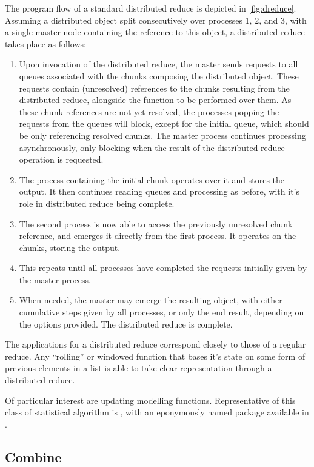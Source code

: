 The program flow of a standard distributed reduce is depicted in \cref{fig:dreduce}.
Assuming a distributed object split consecutively over processes 1, 2, and 3, with a single master node containing the reference to this object, a distributed reduce takes place as follows:
\begin{enumerate}
	\item Upon invocation of the distributed reduce, the master sends requests to all queues associated with the chunks composing the distributed object. These requests contain (unresolved) references to the chunks resulting from the distributed reduce, alongside the function to be performed over them. As these chunk references are not yet resolved, the processes popping the requests from the queues will block, except for the initial queue, which should be only referencing resolved chunks. The master process continues processing asynchronously, only blocking when the result of the distributed reduce operation is requested.
	\item The process containing the initial chunk operates over it and stores the output. It then continues reading queues and processing as before, with it's role in distributed reduce being complete.
	\item The second process is now able to access the previously unresolved chunk reference, and emerges it directly from the first process. It operates on the chunks, storing the output.
	\item This repeats until all processes have completed the requests initially given by the master process.
	\item When needed, the master may emerge the resulting object, with either cumulative steps given by all processes, or only the end result, depending on the options provided. The distributed reduce is complete.
\end{enumerate}

The applications for a distributed reduce correspond closely to those of a regular reduce.
Any ``rolling'' or windowed function that bases it's state on some form of previous elements in a list is able to take clear representation through a distributed reduce.

Of particular interest are updating modelling functions.
Representative of this class of statistical algorithm is , with an eponymously named package available in \R{}.

\subsection{Combine}\label{sec:combine}

